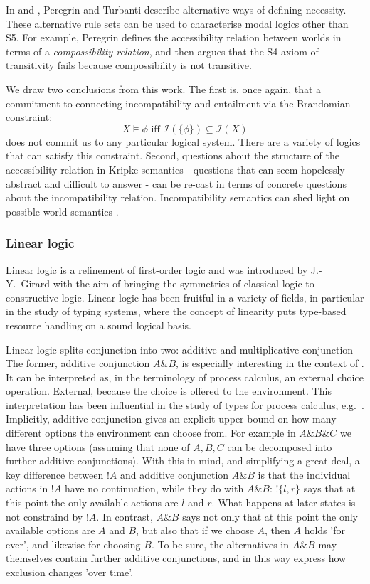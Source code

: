 In \cite{peregrine} and \cite{turbanti}, Peregrin and Turbanti describe alternative ways of defining necessity.
These alternative rule sets can be used to characterise modal logics other than S5.
For example, Peregrin defines the accessibility relation between worlds in terms of a \emph{compossibility relation}, and then argues that the S4 axiom of transitivity fails because compossibility is not transitive.

We draw two conclusions from this work.
The first is, once again, that a commitment to connecting incompatibility and entailment via the Brandomian constraint:
\[
X \models \phi \text{ iff } \mathcal{I}(\{\phi\}) \subseteq \mathcal{I}(X)
\]
does not commit us to any particular logical system. 
There are a variety of logics that can satisfy this constraint.
Second, questions about the structure of the accessibility relation in Kripke semantics - questions that can seem hopelessly abstract and difficult to answer - can be re-cast in terms of concrete questions about the incompatibility relation.
Incompatibility semantics can shed light on possible-world semantics \cite{turbanti}. 

\subsubsection{Linear logic}

Linear logic \cite{GirardJY:linlog,GirardJY:protyp} is a refinement of
first-order logic and was introduced by J.-Y.~Girard with the aim of
bringing the symmetries of classical logic to constructive
logic. Linear logic has been fruitful in a variety of fields, in
particular in the study of typing systems, where the concept of
linearity puts type-based resource handling on a sound logical basis.

Linear logic splits conjunction into two: additive and multiplicative
conjunction The former, additive conjunction $A \& B$, is especially
interesting in the context of \cathoristic{}. It can be interpreted
\cite{AbramskyS:comintoll} as, in the terminology of process calculus,
an external choice operation. External, because the choice is offered
to the environment.  This interpretation has been influential in the
study of types for process calculus,
e.g.~\cite{HondaK:unitypsfsifLONG,TakeuchiK:intbaslaits,HondaK:lanpriatdfscbp}.
Implicitly, additive conjunction gives an explicit upper bound on how
many different options the environment can choose from. For example in
$A \& B \& C$ we have three options (assuming that none of $A, B, C$
can be decomposed into further additive conjunctions).  With this in
mind, and simplifying a great deal, a key difference between $!A$ and
additive conjunction $A \& B$ is that the individual actions in $!A$
have no continuation, while they do with $A \& B$: $!\{l, r\}$ says
that at this point the only available actions are $l$ and $r$. What
happens at later states is not constraind by $!A$.  In contrast, $A \&
B$ says not only that at this point the only available options are $A$
and $B$, but also that if we choose $A$, then $A$ holds 'for ever',
and likewise for choosing $B$. To be sure, the alternatives in $A \&
B$ may themselves contain further additive conjunctions, and in this
way express how exclusion changes 'over time'.

